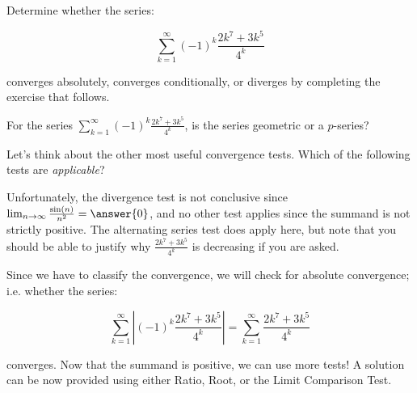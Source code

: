 \documentclass{ximera}
\author{Jim Talamo}
\begin{document}
\begin{exercise}

Determine whether the series:

\[
\sum_{k=1}^{\infty} (-1)^k \frac{2k^7+3k^5}{4^k}
\]

converges absolutely, converges conditionally, or diverges by completing the exercise that follows.

\begin{hint}
For the series $\sum_{k=1}^{\infty}(-1)^k \frac{2k^7+3k^5}{4^k}$, is the series geometric or a $p$-series?

\begin{multipleChoice}
\end{multipleChoice}

Let's think about the other most useful convergence tests.  Which of the following tests are \emph{applicable}?

\begin{selectAll}
\end{selectAll}

Unfortunately, the divergence test is not conclusive since $\lim_{n \to \infty} \frac{\sin(n)}{n^2} = \answer{0}$, and no other test applies since the summand is not strictly positive.  The alternating series test does apply here, but note that you should be able to justify why $\frac{2k^7+3k^5}{4^k}$ is decreasing if you are asked.

Since we have to classify the convergence, we will check for absolute convergence; i.e. whether the series:

\[
\sum_{k=1}^{\infty} \left|(-1)^k \frac{2k^7+3k^5}{4^k} \right| = \sum_{k=1}^{\infty} \frac{2k^7+3k^5}{4^k}
\]

converges.  Now that the summand is positive, we can use more tests!  A solution can be now provided using either Ratio, Root, or the Limit Comparison Test.
\end{hint}

\end{exercise}
\end{document}
